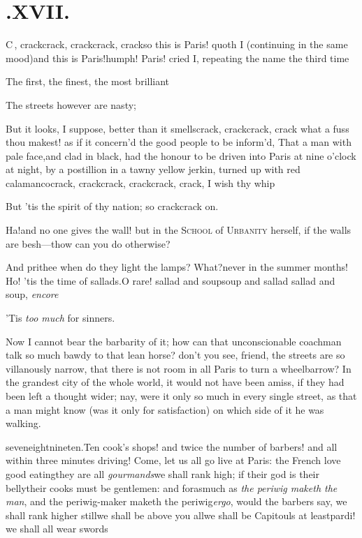 \documentclass{article}
\begin{document}
\newpage
\section{.\enspace XVII.}

\lettrine{C}{\,}, crack\tsh crack, crack\break\tsh crack, crack\tsk so this is Paris!  quoth I
(continuing in the same mood)\tsk and this is Paris!\tsh humph!\break
\tsh Paris! cried I, repeating the name the third time\tsh

The first, the finest, the most brilliant\tsh

\tsk The streets however are nasty;

But it looks, I suppose, better than it smells\tsh crack, crack\tsh crack, crack\tsh
what a fuss thou makest!\tsk\break
as if it concern’d the good people to be inform’d, That a
man with pale face,\pb and clad in black, had the honour to be driven into Paris at nine
o’clock at night, by a postillion in a tawny yellow jerkin, turned up with red
calamanco\tsk crack, crack\tsh crack, crack\tsh crack, crack,\break
\tsh I wish thy whip\tsh

\tsh But ’tis the spirit of thy nation; so crack\tsk crack on.

Ha!\tsh and no one gives the wall!\break
\tsh but in the \textsc{School} of \textsc{Urbanity}\break
herself, if the walls are besh—t\tsk how can you do otherwise?

And prithee when do they light the lamps? What?\tsk never in the summer months!\tsh
Ho!  ’tis the time of sallads.\break\tsh O rare! sallad and soup\tsk soup and sallad\tsk
sallad and soup, \textit{encore}\tsh

\newpage
\tsh ’Tis \textit{too much} for sinners.

Now I cannot bear the barbarity of it;\break
how can that unconscionable coachman talk so much bawdy to that lean horse?\break
don’t you see, friend, the streets are so villanously narrow, that there is not room in
all Paris to turn a wheelbarrow?\break
In the grandest city of the whole world, it would
not have been amiss, if they had been left a thought wider; nay, were it only so
much in every single street, as that a man might know (was it only for satisfaction)
on which side of it he was walking.

\noindent
{}\break
seven\tsk eight\tsk nine\tsk ten.\tsk Ten cook’s
shops! and twice the number of barbers! and all within three minutes driving!\pb
{}
Come, let us all go live at Paris: the French
love good eating\tsh they are all \textit{gourmands}\tsh we shall rank high; if their
god is their belly\tsh their cooks must be gentlemen: and forasmuch as \textit{the
periwig maketh the man}, and the periwig-maker maketh the periwig\tsk \textit{ergo},
would the barbers say, we shall rank higher still\tsk we shall be above you all\tsk we
shall be {} Capitouls at
least\tsk pardi! we shall all wear swords\tsh
\end{document}
